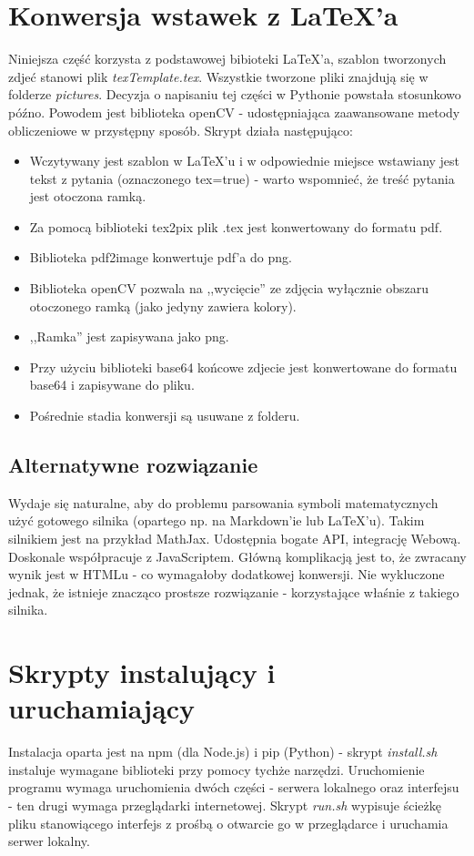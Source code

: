 \section{Konwersja wstawek z \LaTeX{}'a}
Niniejsza część korzysta z podstawowej bibioteki \LaTeX{}'a, szablon tworzonych zdjeć stanowi plik \textit{texTemplate.tex}. Wszystkie tworzone pliki znajdują się w folderze \textit{pictures}.
\ind Decyzja o napisaniu tej części w Pythonie powstała stosunkowo późno. Powodem jest biblioteka openCV - udostępniająca zaawansowane metody obliczeniowe w przystępny sposób. Skrypt działa następująco:
\begin{itemize}
\item Wczytywany jest szablon w \LaTeX{}'u i w odpowiednie miejsce wstawiany jest tekst z pytania (oznaczonego tex=true) - warto wspomnieć, że treść pytania jest otoczona ramką.
\item Za pomocą biblioteki tex2pix plik .tex jest konwertowany do formatu pdf.
\item Biblioteka pdf2image konwertuje pdf'a do png.
\item Biblioteka openCV pozwala na ,,wycięcie'' ze zdjęcia wyłącznie obszaru otoczonego ramką (jako jedyny zawiera kolory).
\item ,,Ramka'' jest zapisywana jako png.
\item Przy użyciu biblioteki base64 końcowe zdjecie jest konwertowane do formatu base64 i zapisywane do pliku.
\item Pośrednie stadia konwersji są usuwane z folderu.
\end{itemize}
\subsection{Alternatywne rozwiązanie}%
Wydaje się naturalne, aby do problemu parsowania symboli matematycznych użyć gotowego silnika (opartego np. na Markdown'ie lub \LaTeX{}'u). Takim silnikiem jest na przykład MathJax. Udostępnia bogate API, integrację Webową. Doskonale współpracuje z JavaScriptem. Główną komplikacją jest to, że zwracany wynik jest w HTMLu - co wymagałoby dodatkowej konwersji. Nie wykluczone jednak, że istnieje znacząco prostsze rozwiązanie - korzystające właśnie z takiego silnika.
\section{Skrypty instalujący i uruchamiający}
Instalacja oparta jest na npm (dla Node.js) i pip (Python) - skrypt \textit{install.sh} instaluje wymagane biblioteki przy pomocy tychże narzędzi.
\ind  Uruchomienie programu wymaga uruchomienia dwóch części - serwera lokalnego oraz interfejsu - ten drugi wymaga przeglądarki internetowej. Skrypt \textit{run.sh} wypisuje ścieżkę pliku stanowiącego interfejs z prośbą o otwarcie go w przeglądarce i uruchamia serwer lokalny.










